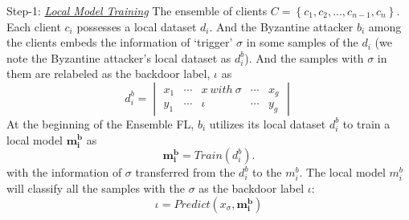 \documentclass[journal]{IEEEtran}
\begin{document}
\par Step-1: \ul{\textit{Local Model Training}} The ensemble of clients $C=\left \{ c_{1},c_{2},...,c_{n-1},c_{n} \right \}$. Each client $c_i$ possesses a local dataset $d_i$. And the Byzantine attacker $b_i$ among the clients embeds the information of `trigger' $\sigma$ in some samples of the $d_i$ (we note the Byzantine attacker's local dataset as $d_i^b$). And the samples with $\sigma$ in them are relabeled as the backdoor label, $\iota$ as
\begin{equation}
  d_i^b=\begin{vmatrix}
    x_{1} & \cdots  & x \ with \ \sigma  & \cdots & x_{g}\\ 
    y_{1} & \cdots  & \iota & \cdots & y_{g}
\end{vmatrix}
\end{equation}
At the beginning of the Ensemble FL, $b_{i}$ utilizes its local dataset $d_i^b$ to train a local model $\mathbf{m_i^b}$ as
\begin{equation}
  \mathbf{m_i^b}=Train(d_i^b).
\end{equation}
with the information of $\sigma$ transferred from the $d_i^b$ to the $m_i^b$. The local model $m_i^b$ will classify all the samples with the $\sigma$ as the backdoor label $\iota$:
\begin{equation}
  \iota=Predict(x_\sigma, \mathbf{m_i^b})
\end{equation}
\end{document}
